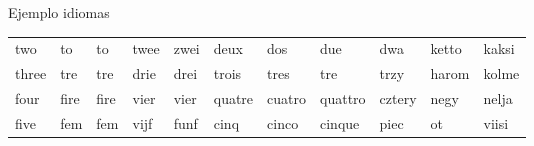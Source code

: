 \documentclass[spanish]{beamer}
\begin{document}
\begin{frame}{Ejemplo idiomas}
\begin{table}[h]
{\begin{tabular}{lllllllllll}
two                                                  & to                                                    & to                                                   & twee                                                    & zwei                                                 & deux                                                   & dos                                                    & due                                                    & dwa                                                  & ketto                                                 & kaksi                                                \\
three                                                & tre                                                   & tre                                                  & drie                                                    & drei                                                 & trois                                                  & tres                                                   & tre                                                    & trzy                                                 & harom                                                 & kolme                                                \\
four                                                 & fire                                                  & fire                                                 & vier                                                    & vier                                                 & quatre                                                 & cuatro                                                 & quattro                                                & cztery                                               & negy                                                  & nelja                                                \\
five                                                 & fem                                                   & fem                                                  & vijf                                                    & funf                                                 & cinq                                                   & cinco                                                  & cinque                                                 & piec                                                 & ot                                                    & viisi                                                \\

\end{tabular}}
\end{table}
\end{frame}
\end{document}
